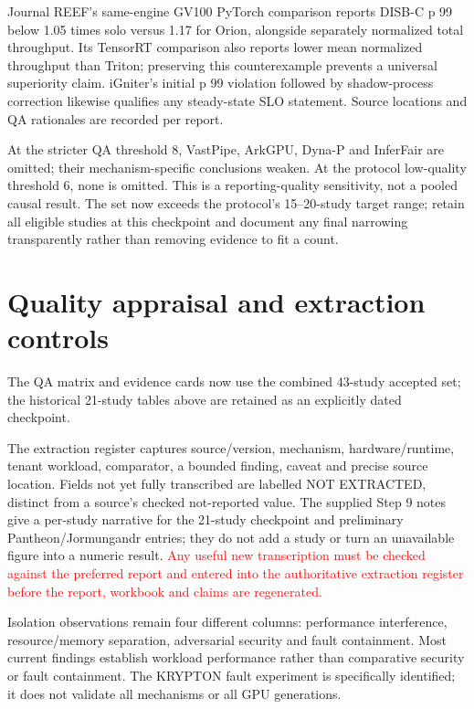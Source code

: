 \documentclass[12pt,a4paper]{article}
\newcommand{\pending}[1]{\textcolor{red}{#1}}
\begin{document}
Journal REEF's same-engine GV100 PyTorch comparison reports DISB-C p 99 below 1.05 times solo versus 1.17 for Orion, alongside separately normalized total throughput. Its TensorRT comparison also reports lower mean normalized throughput than Triton; preserving this counterexample prevents a universal superiority claim. iGniter's initial p 99 violation followed by shadow-process correction likewise qualifies any steady-state SLO statement. Source locations and QA rationales are recorded per report.

At the stricter QA threshold 8, VastPipe, ArkGPU, Dyna-P and InferFair are omitted; their mechanism-specific conclusions weaken. At the protocol low-quality threshold 6, none is omitted. This is a reporting-quality sensitivity, not a pooled causal result. The set now exceeds the protocol's 15--20-study target range; retain all eligible studies at this checkpoint and document any final narrowing transparently rather than removing evidence to fit a count.

\section{Quality appraisal and extraction controls}

The QA matrix and evidence cards now use the combined 43-study accepted set; the historical 21-study tables above are retained as an explicitly dated checkpoint.

The extraction register captures source/version, mechanism, hardware/runtime, tenant workload, comparator, a bounded finding, caveat and precise source location. Fields not yet fully transcribed are labelled NOT EXTRACTED, distinct from a source's checked not-reported value. The supplied Step 9 notes give a per-study narrative for the 21-study checkpoint and preliminary Pantheon/Jormungandr entries; they do not add a study or turn an unavailable figure into a numeric result. \pending{Any useful new transcription must be checked against the preferred report and entered into the authoritative extraction register before the report, workbook and claims are regenerated.}

Isolation observations remain four different columns: performance interference, resource/memory separation, adversarial security and fault containment. Most current findings establish workload performance rather than comparative security or fault containment. The KRYPTON fault experiment is specifically identified; it does not validate all mechanisms or all GPU generations.
\end{document}
